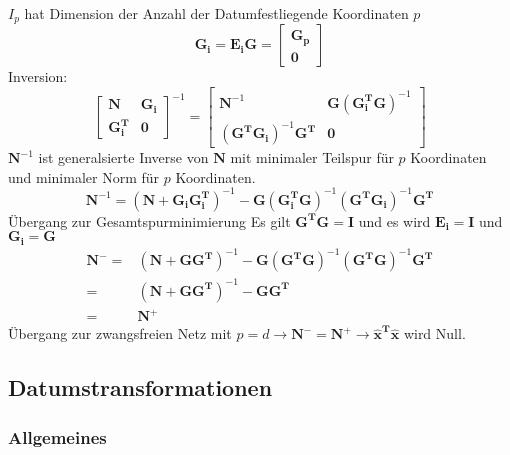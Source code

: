 \documentclass[12pt]{article}
\begin{document}
$I_p$ hat Dimension der Anzahl der Datumfestliegende Koordinaten $p$
\begin{equation*}
\bm{G_i} = \bm{E_i}\bm{G} = \begin{bmatrix}
\bm{G_p} \\
\bm{0}
\end{bmatrix}
\end{equation*}
Inversion:
\begin{equation*}
\begin{bmatrix}
\bm{N} & \bm{G_i}\\
\bm{G_i^T} & \bm{0}
\end{bmatrix}^{-1} = \begin{bmatrix}
\bm{N}^{-1} & \bm{G(G_i^T G)}^{-1}\\
(\bm{G^T G_i})^{-1} \bm{G^T} & \bm{0}
\end{bmatrix}
\end{equation*}
$\bm{N}^{-1}$ ist generalsierte Inverse von $\bm{N}$ mit minimaler Teilspur für $p$ Koordinaten und minimaler Norm für $p$ Koordinaten.
\begin{equation*}
\bm{N}^{-1} = (\bm{N + G_i G_i^T})^{-1} - \bm{G(G_i^T G)}^{-1} \bm{(G^T G_i)}^{-1} \bm{G^T}
\end{equation*}
Übergang zur Gesamtspurminimierung\newline
Es gilt $\bm{G^T G} = \bm{I}$ und es wird $\bm{E_i} = \bm{I}$ und $\bm{G_i} = \bm{G}$
\begin{align*}
\bm{N}^- =& (\bm{N} + \bm{G G^T})^{-1} - \bm{G}(\bm{G^T G})^{-1}(\bm{G^T G})^{-1} \bm{G^T}\\
= & (\bm{N} + \bm{G G^T})^{-1} - \bm{G}\bm{G^T}\\
= & \bm{N^{+}}
\end{align*}
Übergang zur zwangsfreien Netz mit $p=d\rightarrow \bm{N}^{-} = \bm{N}^{+} \rightarrow \bm{\hat{x}^T \hat{x}}$ wird Null.
\subsection{Datumstransformationen}
\subsubsection{Allgemeines}
\end{document}
